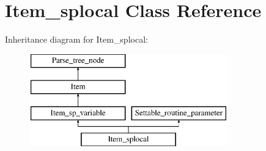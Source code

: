 \hypertarget{classItem__splocal}{}\section{Item\+\_\+splocal Class Reference}
\label{classItem__splocal}
Inheritance diagram for Item\+\_\+splocal\+:\begin{figure}[H]
\begin{center}
\leavevmode
\includegraphics[height=4.000000cm]{classItem__splocal}
\end{center}
\end{figure}
